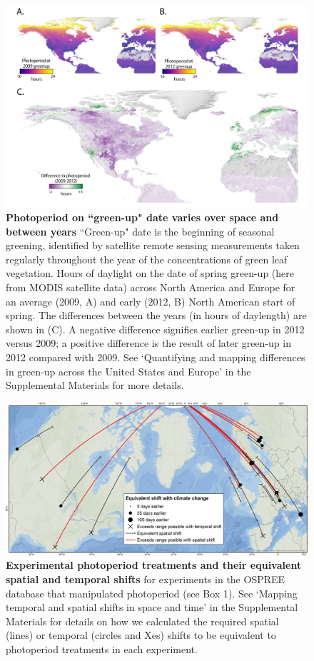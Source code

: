 \documentclass{article}
\begin{document}
 \begin{figure}[p]
\centering
\includegraphics{..//..//docs/photoperiod/figures/Greenup_corr_sm_leg.pdf} %
\caption{\textbf{Photoperiod on ``green-up" date varies over space and between years} ``Green-up" date is the beginning of seasonal greening, identified by satellite remote sensing measurements taken regularly throughout the year of the concentrations of green leaf vegetation. Hours of daylight on the date of spring green-up (here from MODIS satellite data) across North America and Europe for an average (2009, A) and early (2012, B) North American start of spring. The differences between the years (in hours of daylength) are shown in (C). A negative difference signifies earlier green-up in 2012 versus 2009; a positive difference is the result of later green-up in 2012 compared with 2009. See `Quantifying and mapping differences in green-up across the United States and Europe' in the Supplemental Materials for more details. }%
 \label{fig:greenup}%
 \end{figure}

\begin{figure}[p]
\centering
\includegraphics{..//..//analyses/photoperiod/figures/ospree_photopmap_fromblake.jpg} 
\caption{\textbf{Experimental photoperiod treatments and their equivalent spatial and temporal shifts} for experiments in the OSPREE database that manipulated photoperiod (see Box 1). See `Mapping temporal and spatial shifts in space and time' in the Supplemental Materials for details on how we calculated the required spatial (lines) or temporal (circles and Xes) shifts to be equivalent to photoperiod treatments in each experiment.}
 \label{fig:photomap}
 \end{figure}
\end{document}
